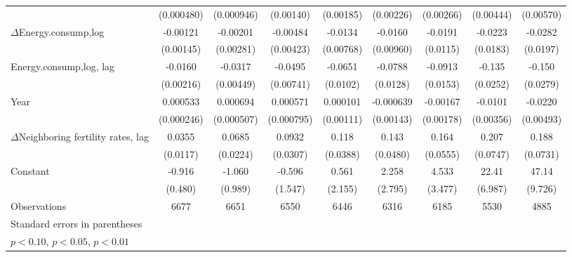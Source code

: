 \begin{table}[htbp]
\begin{tabular}{l*{8}{c}}
                    &  (0.000480)         &  (0.000946)         &   (0.00140)         &   (0.00185)         &   (0.00226)         &   (0.00266)         &   (0.00444)         &   (0.00570)         \\
[1em]
$\Delta$Energy.consump,log            &    -0.00121         &    -0.00201         &    -0.00484         &     -0.0134\sym{*}  &     -0.0160\sym{*}  &     -0.0191\sym{*}  &     -0.0223         &     -0.0282         \\
                    &   (0.00145)         &   (0.00281)         &   (0.00423)         &   (0.00768)         &   (0.00960)         &    (0.0115)         &    (0.0183)         &    (0.0197)         \\
[1em]
Energy.consump,log, lag           &     -0.0160\sym{***}&     -0.0317\sym{***}&     -0.0495\sym{***}&     -0.0651\sym{***}&     -0.0788\sym{***}&     -0.0913\sym{***}&      -0.135\sym{***}&      -0.150\sym{***}\\
                    &   (0.00216)         &   (0.00449)         &   (0.00741)         &    (0.0102)         &    (0.0128)         &    (0.0153)         &    (0.0252)         &    (0.0279)         \\
[1em]
Year                &    0.000533\sym{**} &    0.000694         &    0.000571         &    0.000101         &   -0.000639         &    -0.00167         &     -0.0101\sym{***}&     -0.0220\sym{***}\\
                    &  (0.000246)         &  (0.000507)         &  (0.000795)         &   (0.00111)         &   (0.00143)         &   (0.00178)         &   (0.00356)         &   (0.00493)         \\
[1em]
$\Delta$Neighboring fertility rates, lag&      0.0355\sym{***}&      0.0685\sym{***}&      0.0932\sym{***}&       0.118\sym{***}&       0.143\sym{***}&       0.164\sym{***}&       0.207\sym{***}&       0.188\sym{**} \\
                    &    (0.0117)         &    (0.0224)         &    (0.0307)         &    (0.0388)         &    (0.0480)         &    (0.0555)         &    (0.0747)         &    (0.0731)         \\
[1em]
Constant            &      -0.916\sym{*}  &      -1.060         &      -0.596         &       0.561         &       2.258         &       4.533         &       22.41\sym{***}&       47.14\sym{***}\\
                    &     (0.480)         &     (0.989)         &     (1.547)         &     (2.155)         &     (2.795)         &     (3.477)         &     (6.987)         &     (9.726)         \\
\hline
Observations        &        6677         &        6651         &        6550         &        6446         &        6316         &        6185         &        5530         &        4885         \\
\hline\hline
\multicolumn{9}{l}{\footnotesize Standard errors in parentheses}\\
\multicolumn{9}{l}{\footnotesize \sym{*} \(p<0.10\), \sym{**} \(p<0.05\), \sym{***} \(p<0.01\)}\\
\end{tabular}
\end{table}
